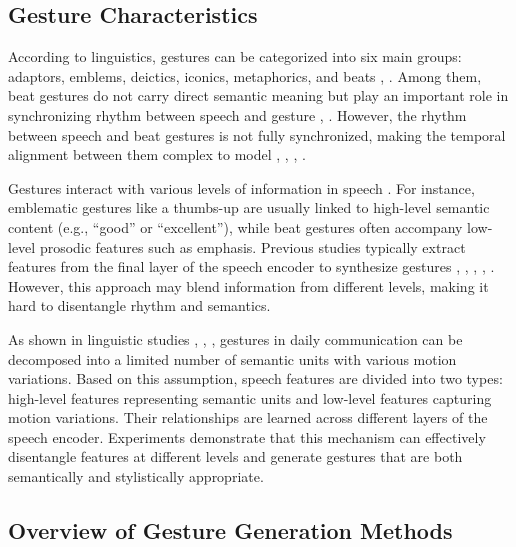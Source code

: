 \subsection{Gesture Characteristics}
\label{sec:relationspeechandgesture}

According to linguistics, gestures can be categorized into six main groups: adaptors, emblems, deictics, iconics, metaphorics, and beats \cite{ekman1969repertoire}, \cite{sebeok2011advances}. Among them, beat gestures do not carry direct semantic meaning but play an important role in synchronizing rhythm between speech and gesture \cite{kipp2005gesture}, \cite{sebeok2011advances}. However, the rhythm between speech and beat gestures is not fully synchronized, making the temporal alignment between them complex to model \cite{mcclave1994gestural}, \cite{bhattacharya2021speech2affectivegestures}, \cite{kucherenko2020gesticulator}, \cite{yoon2020speech}.

Gestures interact with various levels of information in speech \cite{sebeok2011advances}. For instance, emblematic gestures like a thumbs-up are usually linked to high-level semantic content (e.g., “good” or “excellent”), while beat gestures often accompany low-level prosodic features such as emphasis. Previous studies typically extract features from the final layer of the speech encoder to synthesize gestures \cite{alexanderson2020style}, \cite{bhattacharya2021speech2affectivegestures}, \cite{kucherenko2021large}, \cite{qian2021speech}, \cite{yoon2022genea}. However, this approach may blend information from different levels, making it hard to disentangle rhythm and semantics.

As shown in linguistic studies \cite{kipp2005gesture}, \cite{neff2008gesture}, \cite{webb1997linguistic}, gestures in daily communication can be decomposed into a limited number of semantic units with various motion variations. Based on this assumption, speech features are divided into two types: high-level features representing semantic units and low-level features capturing motion variations. Their relationships are learned across different layers of the speech encoder. Experiments demonstrate that this mechanism can effectively disentangle features at different levels and generate gestures that are both semantically and stylistically appropriate.

\subsection{Overview of Gesture Generation Methods}
\label{sec:relatedwork}


